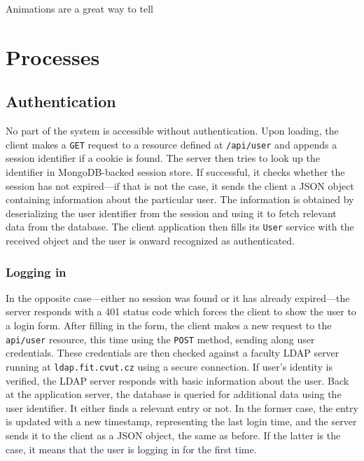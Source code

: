 \documentclass[thesis=M,english,hidelinks]{FITthesis}[2012/10/20]
\newcommand{\code}{\texttt}
\begin{document}
Animations are a great way to tell

\chapter{Processes}

  \section{Authentication}

No part of the system is accessible without authentication. Upon loading, the client makes a \code{GET} request to a resource defined at \code{/api/user} and appends a session identifier if a cookie is found. The server then tries to look up the identifier in MongoDB-backed session store. If successful, it checks whether the session has not expired---if that is not the case, it sends the client a JSON object containing information about the particular user. The information is obtained by deserializing the user identifier from the session and using it to fetch relevant data from the database. The client application then fills its \code{User} service with the received object and the user is onward recognized as authenticated.

    \subsection{Logging in}

In the opposite case---either no session was found or it has already expired---the server responds with a 401 status code which forces the client to show the user to a login form. After filling in the form, the client makes a new request to the \code{api/user} resource, this time using the \code{POST} method, sending along user credentials. These credentials are then checked against a faculty LDAP server running at \code{ldap.fit.cvut.cz} using a secure connection. If user's identity is verified, the LDAP server responds with basic information about the user. Back at the application server, the database is queried for additional data using the user identifier. It either finds a relevant entry or not. In the former case, the entry is updated with a new timestamp, representing the last login time, and the server sends it to the client as a JSON object, the same as before. If the latter is the case, it means that the user is logging in for the first time.
\end{document}
